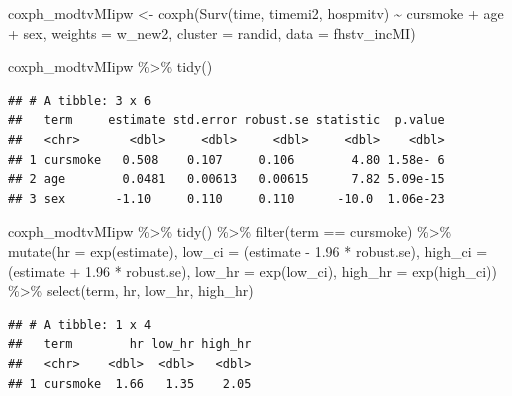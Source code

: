 \documentclass[
]{book}
\newenvironment{Shaded}{\begin{snugshade}}{\end{snugshade}}
\newcommand{\AttributeTok}[1]{\textcolor[rgb]{0.77,0.63,0.00}{#1}}
\newcommand{\FloatTok}[1]{\textcolor[rgb]{0.00,0.00,0.81}{#1}}
\newcommand{\FunctionTok}[1]{\textcolor[rgb]{0.00,0.00,0.00}{#1}}
\newcommand{\NormalTok}[1]{#1}
\newcommand{\OtherTok}[1]{\textcolor[rgb]{0.56,0.35,0.01}{#1}}
\newcommand{\SpecialCharTok}[1]{\textcolor[rgb]{0.00,0.00,0.00}{#1}}
\newcommand{\StringTok}[1]{\textcolor[rgb]{0.31,0.60,0.02}{#1}}
\begin{document}
\begin{Shaded}
\begin{Highlighting}[]
\NormalTok{coxph\_modtvMIipw }\OtherTok{\textless{}{-}} \FunctionTok{coxph}\NormalTok{(}\FunctionTok{Surv}\NormalTok{(time, timemi2, hospmitv) }\SpecialCharTok{\textasciitilde{}} 
\NormalTok{                                cursmoke }\SpecialCharTok{+}\NormalTok{ age }\SpecialCharTok{+}\NormalTok{ sex, }
                          \AttributeTok{weights =}\NormalTok{ w\_new2, }\AttributeTok{cluster =}\NormalTok{ randid,}
                          \AttributeTok{data =}\NormalTok{ fhstv\_incMI)}

\NormalTok{coxph\_modtvMIipw }\SpecialCharTok{\%\textgreater{}\%}
  \FunctionTok{tidy}\NormalTok{()}
\end{Highlighting}
\end{Shaded}

\begin{verbatim}
## # A tibble: 3 x 6
##   term     estimate std.error robust.se statistic  p.value
##   <chr>       <dbl>     <dbl>     <dbl>     <dbl>    <dbl>
## 1 cursmoke   0.508    0.107     0.106        4.80 1.58e- 6
## 2 age        0.0481   0.00613   0.00615      7.82 5.09e-15
## 3 sex       -1.10     0.110     0.110      -10.0  1.06e-23
\end{verbatim}

\begin{Shaded}
\begin{Highlighting}[]
\NormalTok{coxph\_modtvMIipw }\SpecialCharTok{\%\textgreater{}\%} 
  \FunctionTok{tidy}\NormalTok{() }\SpecialCharTok{\%\textgreater{}\%} 
  \FunctionTok{filter}\NormalTok{(term }\SpecialCharTok{==} \StringTok{\textquotesingle{}cursmoke\textquotesingle{}}\NormalTok{) }\SpecialCharTok{\%\textgreater{}\%}
  \FunctionTok{mutate}\NormalTok{(}\AttributeTok{hr =} \FunctionTok{exp}\NormalTok{(estimate),}
         \AttributeTok{low\_ci =}\NormalTok{ (estimate }\SpecialCharTok{{-}} \FloatTok{1.96} \SpecialCharTok{*}\NormalTok{ robust.se), }
         \AttributeTok{high\_ci =}\NormalTok{ (estimate }\SpecialCharTok{+} \FloatTok{1.96} \SpecialCharTok{*}\NormalTok{ robust.se), }
         \AttributeTok{low\_hr =} \FunctionTok{exp}\NormalTok{(low\_ci), }
         \AttributeTok{high\_hr =} \FunctionTok{exp}\NormalTok{(high\_ci)) }\SpecialCharTok{\%\textgreater{}\%} 
  \FunctionTok{select}\NormalTok{(term, hr, low\_hr, high\_hr)}
\end{Highlighting}
\end{Shaded}

\begin{verbatim}
## # A tibble: 1 x 4
##   term        hr low_hr high_hr
##   <chr>    <dbl>  <dbl>   <dbl>
## 1 cursmoke  1.66   1.35    2.05
\end{verbatim}
\end{document}
